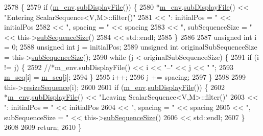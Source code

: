 \begin{DoxyCode}
2578 \{
2579   \textcolor{keywordflow}{if} (\hyperlink{class_q_u_e_s_o_1_1_scalar_sequence_a71618cd6351b29361b437af68447a4c8}{m\_env}.\hyperlink{class_q_u_e_s_o_1_1_base_environment_a8a0064746ae8dddfece4229b9ad374d6}{subDisplayFile}()) \{
2580     *\hyperlink{class_q_u_e_s_o_1_1_scalar_sequence_a71618cd6351b29361b437af68447a4c8}{m\_env}.\hyperlink{class_q_u_e_s_o_1_1_base_environment_a8a0064746ae8dddfece4229b9ad374d6}{subDisplayFile}() << \textcolor{stringliteral}{"Entering ScalarSequence<V,M>::filter()"}
2581                             << \textcolor{stringliteral}{": initialPos = "}      << initialPos
2582                             << \textcolor{stringliteral}{", spacing = "}         << spacing
2583                             << \textcolor{stringliteral}{", subSequenceSize = "} << this->\hyperlink{class_q_u_e_s_o_1_1_scalar_sequence_a0288ea295eedc216a1617b3286f6f3a0}{subSequenceSize}()
2584                             << std::endl;
2585   \}
2586 
2587   \textcolor{keywordtype}{unsigned} \textcolor{keywordtype}{int} i = 0;
2588   \textcolor{keywordtype}{unsigned} \textcolor{keywordtype}{int} j = initialPos;
2589   \textcolor{keywordtype}{unsigned} \textcolor{keywordtype}{int} originalSubSequenceSize = this->\hyperlink{class_q_u_e_s_o_1_1_scalar_sequence_a0288ea295eedc216a1617b3286f6f3a0}{subSequenceSize}();
2590   \textcolor{keywordflow}{while} (j < originalSubSequenceSize) \{
2591     \textcolor{keywordflow}{if} (i != j) \{
2592       \textcolor{comment}{//*m\_env.subDisplayFile() << i << "--" << j << " ";}
2593       \hyperlink{class_q_u_e_s_o_1_1_scalar_sequence_ae616036fd2e62fb69df167814545e893}{m\_seq}[i] = \hyperlink{class_q_u_e_s_o_1_1_scalar_sequence_ae616036fd2e62fb69df167814545e893}{m\_seq}[j];
2594     \}
2595     i++;
2596     j += spacing;
2597   \}
2598 
2599   this->\hyperlink{class_q_u_e_s_o_1_1_scalar_sequence_a2aa8d77c39927060227275b12b6d3dd0}{resizeSequence}(i);
2600 
2601   \textcolor{keywordflow}{if} (\hyperlink{class_q_u_e_s_o_1_1_scalar_sequence_a71618cd6351b29361b437af68447a4c8}{m\_env}.\hyperlink{class_q_u_e_s_o_1_1_base_environment_a8a0064746ae8dddfece4229b9ad374d6}{subDisplayFile}()) \{
2602     *\hyperlink{class_q_u_e_s_o_1_1_scalar_sequence_a71618cd6351b29361b437af68447a4c8}{m\_env}.\hyperlink{class_q_u_e_s_o_1_1_base_environment_a8a0064746ae8dddfece4229b9ad374d6}{subDisplayFile}() << \textcolor{stringliteral}{"Leaving ScalarSequence<V,M>::filter()"}
2603                             << \textcolor{stringliteral}{": initialPos = "}      << initialPos
2604                             << \textcolor{stringliteral}{", spacing = "}         << spacing
2605                             << \textcolor{stringliteral}{", subSequenceSize = "} << this->\hyperlink{class_q_u_e_s_o_1_1_scalar_sequence_a0288ea295eedc216a1617b3286f6f3a0}{subSequenceSize}()
2606                             << std::endl;
2607   \}
2608 
2609   \textcolor{keywordflow}{return};
2610 \}
\end{DoxyCode}
